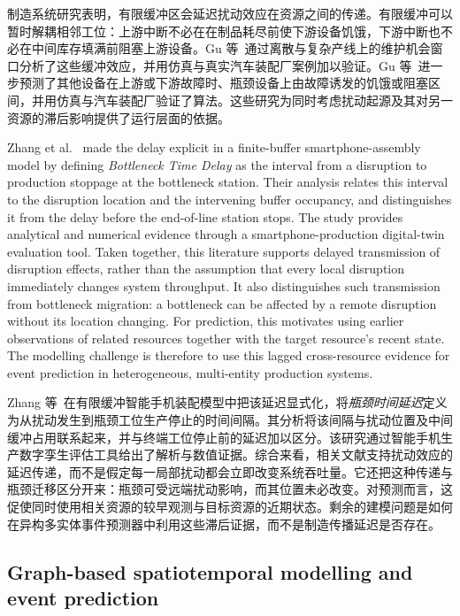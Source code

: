 \documentclass[a4paper,fleqn]{cas-dc}
\newcommand{\zhpara}[1]{%
  \par\begingroup\small\color{black!72}\noindent #1\par\endgroup}
\begin{document}
\zhpara{制造系统研究表明，有限缓冲区会延迟扰动效应在资源之间的传递。有限缓冲可以暂时解耦相邻工位：上游中断不必在在制品耗尽前使下游设备饥饿，下游中断也不必在中间库存填满前阻塞上游设备。Gu 等~\cite{gu2013hidden}通过离散与复杂产线上的维护机会窗口分析了这些缓冲效应，并用仿真与真实汽车装配厂案例加以验证。Gu 等~\cite{gu2015passive}进一步预测了其他设备在上游或下游故障时、瓶颈设备上由故障诱发的饥饿或阻塞区间，并用仿真与汽车装配厂验证了算法。这些研究为同时考虑扰动起源及其对另一资源的滞后影响提供了运行层面的依据。}


Zhang et al.~\cite{zhang2022vulnerability} made the delay explicit in a finite-buffer smartphone-assembly model by defining \emph{Bottleneck Time Delay} as the interval from a disruption to production stoppage at the bottleneck station. Their analysis relates this interval to the disruption location and the intervening buffer occupancy, and distinguishes it from the delay before the end-of-line station stops. The study provides analytical and numerical evidence through a smartphone-production digital-twin evaluation tool. Taken together, this literature supports delayed transmission of disruption effects, rather than the assumption that every local disruption immediately changes system throughput. It also distinguishes such transmission from bottleneck migration: a bottleneck can be affected by a remote disruption without its location changing. For prediction, this motivates using earlier observations of related resources together with the target resource's recent state. The modelling challenge is therefore to use this lagged cross-resource evidence for event prediction in heterogeneous, multi-entity production systems.

\zhpara{Zhang 等~\cite{zhang2022vulnerability}在有限缓冲智能手机装配模型中把该延迟显式化，将\emph{瓶颈时间延迟}定义为从扰动发生到瓶颈工位生产停止的时间间隔。其分析将该间隔与扰动位置及中间缓冲占用联系起来，并与终端工位停止前的延迟加以区分。该研究通过智能手机生产数字孪生评估工具给出了解析与数值证据。综合来看，相关文献支持扰动效应的延迟传递，而不是假定每一局部扰动都会立即改变系统吞吐量。它还把这种传递与瓶颈迁移区分开来：瓶颈可受远端扰动影响，而其位置未必改变。对预测而言，这促使同时使用相关资源的较早观测与目标资源的近期状态。剩余的建模问题是如何在异构多实体事件预测器中利用这些滞后证据，而不是制造传播延迟是否存在。}


\subsection{Graph-based spatiotemporal modelling and event prediction}
\end{document}
